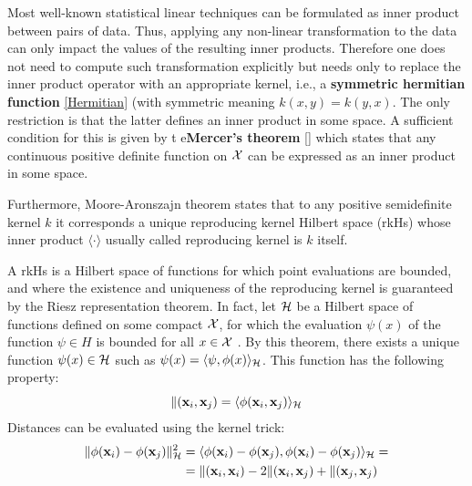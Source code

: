 \documentclass[12pt, letterpaper]{article}
\theoremstyle{definition}
\newcommand{\x}{\mathbf{x}}
\let\tb\textbf
\begin{document}
Most  well-known statistical linear techniques can be formulated as inner product between pairs of data. Thus, applying any non-linear transformation to the data can only impact the values of the resulting inner products. Therefore one does not need to compute such transformation explicitly but needs only to replace the inner product operator with an appropriate kernel, i.e., a \tb{symmetric hermitian function} \autoref{Hermitian} (with symmetric meaning $k(x,y) = k(y,x)$. The only restriction is that the latter defines an inner product in some space. A sufficient condition for this is given by t e\tb{Mercer's theorem} \autoref{} which states that any continuous positive definite function on $\CMcal{X}$ can be expressed as an inner product in some space.

Furthermore, Moore-Aronszajn  theorem states that to any positive semidefinite kernel $k$ it corresponds  a unique reproducing kernel Hilbert space (rkHs)  whose inner product $\langle\cdot \rangle$ usually called reproducing kernel is $k$ itself.

A rkHs is a Hilbert space of functions for which point evaluations are bounded, and where the existence and uniqueness of the reproducing kernel is guaranteed by the Riesz representation theorem. In fact, let $\CMcal{H}$ be a Hilbert space of functions defined on some compact $\CMcal{X}$, for which the evaluation $\psi(x)$ of the function $\psi \in H$ is bounded for all $x \in \CMcal{X}$ . By this theorem, there exists a unique function $\psi(x) \in \CMcal{H}$ such as $\psi(x) = \langle\psi,\phi(x)\rangle_\CMcal{H}$. This function has the following property:
\begin{equation}
\label{EqProd}
\CMcal{k}(\x_i, \x_j) = \langle \phi(\x_i, \x_j) \rangle_\CMcal{H}
\end{equation}
Distances can be evaluated using the kernel trick:
\begin{equation}
\begin{aligned}
\| \phi(\x_i) - \phi(\x_j) \|^2_\CMcal{H} &= \langle \phi(\x_i)- \phi(\x_j),  \phi(\x_i)- \phi(\x_j)\rangle_\CMcal{H}  =\\
&=\CMcal{k}(\x_i, \x_i)- 2 \CMcal{k}(\x_i, \x_j)+\CMcal{k}(\x_j, \x_j)
\end{aligned}
\end{equation}
\end{document}
